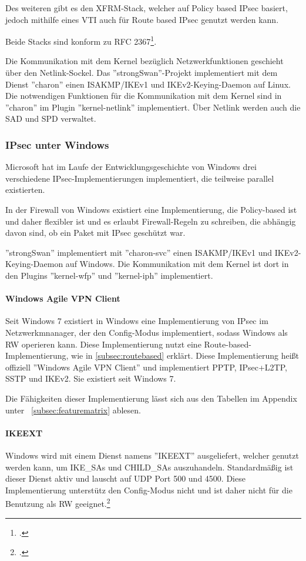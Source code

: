 Des weiteren gibt es den XFRM-Stack, welcher auf Policy based IPsec basiert, jedoch mithilfe eines \ac{VTI}
auch für Route based IPsec genutzt werden kann.

Beide Stacks sind konform zu RFC 2367\footcite[][]{daniel_l._mcdonald_rfc_1998}.

Die Kommunikation mit dem Kernel bezüglich Netzwerkfunktionen geschieht über
den Netlink-Sockel. 
Das ''strongSwan''-Projekt implementiert mit dem Dienst ''charon'' einen \ac{ISAKMP}/IKEv1 und IKEv2-Keying-Daemon
auf Linux.
Die notwendigen Funktionen für die Kommunikation mit dem Kernel sind in ''charon'' im Plugin ''kernel-netlink'' implementiert.
Über Netlink werden auch die \ac{SAD} und \ac{SPD} verwaltet.

\subsubsection{IPsec unter Windows}
Microsoft hat im Laufe der Entwicklungsgeschichte von Windows drei verschiedene
\ac{IPsec}-Implementierungen implementiert, die teilweise parallel existierten.

In der Firewall von Windows existiert eine Implementierung, die Policy-based ist
und daher flexibler ist und es erlaubt Firewall-Regeln zu schreiben, die abhängig davon sind,
ob ein Paket mit \ac{IPsec} geschützt war.

''strongSwan'' implementiert mit ''charon-svc'' einen \ac{ISAKMP}/IKEv1 und IKEv2-Keying-Daemon
auf Windows. Die Kommunikation mit dem Kernel ist dort in den Plugins ''kernel-wfp''
und ''kernel-iph'' implementiert.

\paragraph{Windows Agile VPN Client}
Seit Windows 7 existiert in Windows eine Implementierung von \ac{IPsec} im Netzwerkmnanager,
der den Config-Modus implementiert, sodass Windows als \ac{RW} operieren kann.
Diese Implementierung nutzt eine Route-based-Implementierung, wie in \autoref{subsec:routebased}
erklärt. Diese Implementierung heißt offiziell ''Windows Agile VPN Client'' und
implementiert \ac{PPTP}, \ac{IPsec}+\ac{L2TP}, \ac{SSTP} und \ac{IKE}v2. Sie existiert seit Windows 7.

Die Fähigkeiten dieser Implementierung lässt sich aus den Tabellen im Appendix unter ~\autoref{subsec:featurematrix} ablesen.


\paragraph{IKEEXT}
Windows wird mit einem Dienst namens ''IKEEXT'' ausgeliefert,
welcher genutzt werden kann, um IKE\_SAs und CHILD\_SAs auszuhandeln. Standardmäßig
ist dieser Dienst aktiv und lauscht auf \ac{UDP} Port 500 und 4500.
Diese Implementierung unterstütz den Config-Modus nicht und ist daher nicht für die Benutzung als \ac{RW} geeignet.\footcite[][]{_ipsec_2016}

